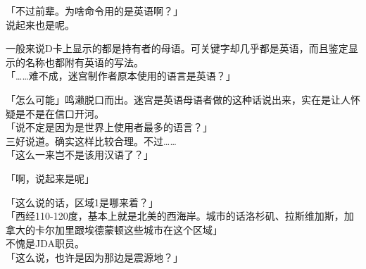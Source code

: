 「不过前辈。为啥命令用的是英语啊？」\\

说起来也是呢。

一般来说D卡上显示的都是持有者的母语。可关键字却几乎都是英语，而且鉴定显示的名称也都附有英语的写法。\\

「……难不成，迷宫制作者原本使用的语言是英语？」

「怎么可能」鸣濑脱口而出。迷宫是英语母语者做的这种话说出来，实在是让人怀疑是不是在信口开河。\\

「说不定是因为是世界上使用者最多的语言？」\\

三好说道。确实这样比较合理。不过……\\

「这么一来岂不是该用汉语了？」

「啊，说起来是呢」

「这么说的话，区域1是哪来着？」\\

「西经110-120度，基本上就是北美的西海岸。城市的话洛杉矶、拉斯维加斯，加拿大的卡尔加里跟埃德蒙顿这些城市在这个区域」\\

不愧是JDA职员。\\

「这么说，也许是因为那边是震源地？」

